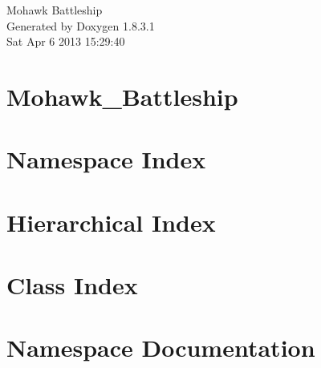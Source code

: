 \documentclass{book}
\begin{document}
\hypersetup{pageanchor=false,citecolor=blue}
\begin{titlepage}
\vspace*{7cm}
\begin{center}
{\Large Mohawk Battleship }\\
\vspace*{1cm}
{\large Generated by Doxygen 1.8.3.1}\\
\vspace*{0.5cm}
{\small Sat Apr 6 2013 15:29:40}\\
\end{center}
\end{titlepage}
\clearemptydoublepage
{}
\tableofcontents
\clearemptydoublepage
{}
\hypersetup{pageanchor=true,citecolor=blue}
\chapter{Mohawk\-\_\-\-Battleship}
\label{md_README}
\hypertarget{md_README}{}

\chapter{Namespace Index}

\chapter{Hierarchical Index}

\chapter{Class Index}

\chapter{Namespace Documentation}











\end{document}
